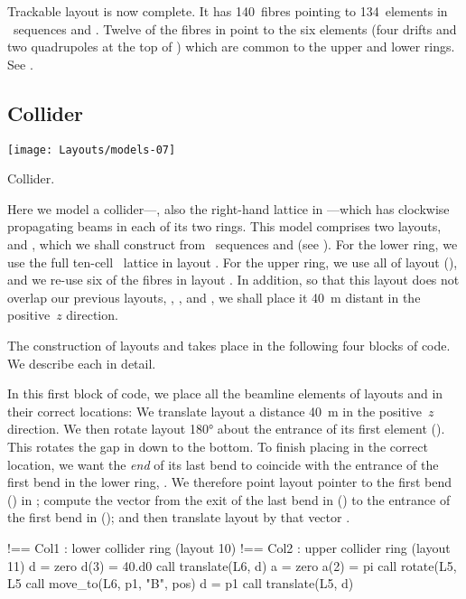 Trackable layout  is now complete. It has 140~fibres
pointing to 134~elements in \DNA\ sequences  and .
Twelve of the fibres in  point to the six elements (four
drifts and two quadrupoles at the top of ) which are common
to the upper and lower rings. See .


\subsection{Collider}

\begin{marginfigure}
  \texttt{[image: Layouts/models-07]}
  \caption{Collider.}
  \label{fig:col1.col2}
\end{marginfigure}

%
Here we model a collider---, also the right-hand
lattice in ---which has clockwise propagating
beams in each of its two rings. This model comprises two layouts,
 and , which we shall construct from
\DNA\ sequences  and  (see ). For
the lower ring, we use the full ten-cell \PSR\ lattice in layout
. For the upper ring, we use all of layout 
(), and we re-use six of the fibres in layout
.%
In addition, so that this layout does not overlap our previous
layouts, , , and , we shall place
it \SI{40}{m} distant in the positive~$z$ direction.

The construction of layouts  and  takes place
in the following four blocks of code. We describe each in detail.

In this first block of code, we place all the beamline elements of
layouts  and  in their correct locations: We
translate layout  a distance \SI{40}{m} in the positive~$z$
direction. We then rotate layout  \ang{180} about the
entrance of its first element (). This
rotates the gap in  down to the bottom. To finish placing
 in the correct location, we want the \emph{end} of its
last bend to coincide with the entrance of the first bend in the
lower ring, . We therefore point layout pointer 
to the first bend () in ; compute the vector
 from the exit of the last bend in 
() to the entrance of the first bend in
 (); and then translate layout 
by that vector .
%
\begin{ptccode}
!== Col1 : lower collider ring (layout 10)
!== Col2 : upper collider ring (layout 11)
d = zero
d(3) = 40.d0
call translate(L6, d)
a = zero
a(2) = pi
call rotate(L5, L5%
call move_to(L6, p1, "B", pos)
d = p1%
call translate(L5, d)
\end{ptccode}

